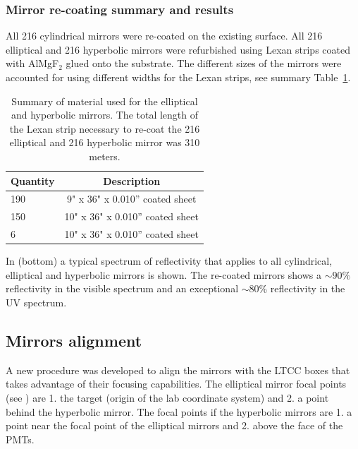 \subsubsection{Mirror re-coating summary and results}

All 216 cylindrical mirrors were re-coated on the existing surface. All 216 elliptical and 216 hyperbolic mirrors were refurbished using Lexan strips
coated with AlMgF$_2$ glued onto the substrate. The different sizes of the mirrors were accounted for using different widths for the Lexan strips, see
summary Table~\ref{tab:strips}.


\begin{table}[h]
	\begin{center}
		\begin{tabular}{| l | c |}
			\hline \hline
			Quantity  & Description \\
			\hline
			190       & 9" x 36" x 0.010” coated sheet    \\
			150       & 10" x 36" x 0.010” coated sheet   \\
			6         & 10" x 36" x 0.010” coated sheet   \\
			\hline \hline
		\end{tabular}
	\end{center}
	\caption{Summary of material used for the elliptical and hyperbolic mirrors. The total length of the Lexan strip necessary to re-coat the 216 elliptical
            and 216 hyperbolic mirror was 310 meters.}\label{tab:strips}
\end{table}


In  (bottom) a typical spectrum of reflectivity that applies to all cylindrical, elliptical and hyperbolic mirrors is shown.
The re-coated mirrors shows a $\sim 90\%$ reflectivity in the visible spectrum and an exceptional $\sim 80\%$
reflectivity in the UV spectrum.



\subsection{Mirrors alignment}

A new procedure was developed to align the mirrors with the LTCC boxes that takes advantage of their focusing capabilities.
The elliptical mirror focal points (see ) are 1. the target (origin of the lab coordinate system)
and 2. a point behind the hyperbolic mirror. The focal points if the hyperbolic mirrors are 1. a point near the focal point of the elliptical mirrors and
2. above the face of the PMTs.

